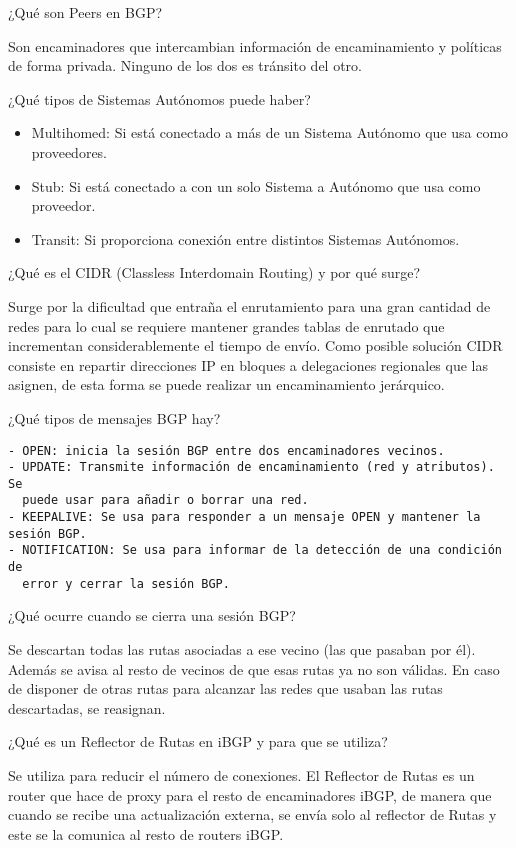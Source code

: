\documentclass[]{article}
\providecommand{\tightlist}{%
  \setlength{\itemsep}{0pt}\setlength{\parskip}{0pt}}
\begin{document}
¿Qué son Peers en BGP?

Son encaminadores que intercambian información de encaminamiento y
políticas de forma privada. Ninguno de los dos es tránsito del otro.

¿Qué tipos de Sistemas Autónomos puede haber?

\begin{itemize}
\tightlist
\item
  Multihomed: Si está conectado a más de un Sistema Autónomo que usa
  como proveedores.
\item
  Stub: Si está conectado a con un solo Sistema a Autónomo que usa como
  proveedor.
\item
  Transit: Si proporciona conexión entre distintos Sistemas Autónomos.
\end{itemize}

¿Qué es el CIDR (Classless Interdomain Routing) y por qué surge?

Surge por la dificultad que entraña el enrutamiento para una gran
cantidad de redes para lo cual se requiere mantener grandes tablas de
enrutado que incrementan considerablemente el tiempo de envío. Como
posible solución CIDR consiste en repartir direcciones IP en bloques a
delegaciones regionales que las asignen, de esta forma se puede realizar
un encaminamiento jerárquico.

¿Qué tipos de mensajes BGP hay?

\begin{verbatim}
- OPEN: inicia la sesión BGP entre dos encaminadores vecinos.
- UPDATE: Transmite información de encaminamiento (red y atributos). Se
  puede usar para añadir o borrar una red.
- KEEPALIVE: Se usa para responder a un mensaje OPEN y mantener la sesión BGP.
- NOTIFICATION: Se usa para informar de la detección de una condición de
  error y cerrar la sesión BGP.
\end{verbatim}

¿Qué ocurre cuando se cierra una sesión BGP?

Se descartan todas las rutas asociadas a ese vecino (las que pasaban por
él). Además se avisa al resto de vecinos de que esas rutas ya no son
válidas. En caso de disponer de otras rutas para alcanzar las redes que
usaban las rutas descartadas, se reasignan.

¿Qué es un Reflector de Rutas en iBGP y para que se utiliza?

Se utiliza para reducir el número de conexiones. El Reflector de Rutas
es un router que hace de proxy para el resto de encaminadores iBGP, de
manera que cuando se recibe una actualización externa, se envía solo al
reflector de Rutas y este se la comunica al resto de routers iBGP.
\end{document}
